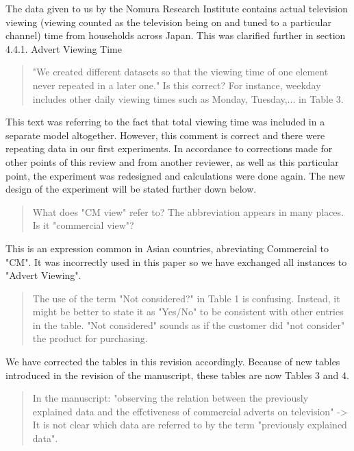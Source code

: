 \documentclass[review]{elsarticle}
\begin{document}
The data given to us by the Nomura Research Institute contains actual television viewing (viewing counted as the television being on and tuned to a particular channel) time from households across Japan. This was clarified further in section 4.4.1. Advert Viewing Time

\begin{quotation}
"We created different datasets so that the viewing time of one element never repeated in a later one." Is this correct? For instance, weekday includes other daily viewing times such as Monday, Tuesday,... in Table 3.
\end{quotation}

This text was referring to the fact that total viewing time was included in a separate model altogether. However, this comment is correct and there were repeating data in our first experiments. In accordance to corrections made for other points of this review and from another reviewer, as well as this particular point, the experiment was redesigned and calculations were done again. The new design of the experiment will be stated further down below.


\begin{quotation}
What does "CM view" refer to? The abbreviation appears in many places. Is it "commercial view"? 
\end{quotation}

This is an expression common in Asian countries, abreviating Commercial to "CM". It was incorrectly used in this paper so we have exchanged all instances to "Advert Viewing".

\begin{quotation}
The use of the term "Not considered?" in Table 1 is confusing. Instead, it might be better to state it as "Yes/No" to be consistent with other entries in the table. "Not considered" sounds as if the customer did "not consider" the product for purchasing.
\end{quotation}

We have corrected the tables in this revision accordingly. Because of new tables introduced in the revision of the manuscript, these tables are now Tables 3 and 4.

\begin{quotation}
In the manuscript: "observing the relation between the previously explained data and the effctiveness of commercial adverts on television" -> It is not clear which data are referred to by the term "previously explained data".
\end{quotation}
\end{document}
